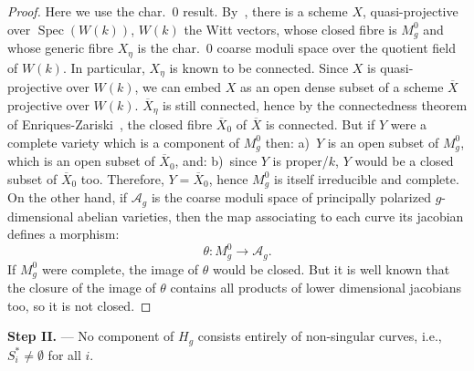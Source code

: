 \documentclass[10pt]{amsart}
\theoremstyle{plain}
\theoremstyle{definition}
\DeclareMathOperator{\Spec}{Spec}
\begin{document}
\begin{proof}
Here we use the char.~$0$ result. By~\cite{M1}, there is a scheme $X$, quasi-projective over $\Spec(W(k))$, $W(k)$ the Witt vectors, whose closed fibre is $M_g^0$ and whose generic fibre $X_\eta$ is the char.~$0$ coarse moduli space over the quotient field of $W(k)$. In particular, $X_\eta$ is known to be connected. Since $X$ is quasi-projective over $W(k)$, we can embed $X$ as an open dense subset of a scheme $\overline{X}$ projective over $W(k)$. $\overline{X}_\eta$ is still connected, hence by the connectedness theorem of Enriques-Zariski~\cite{EGA3}, the closed fibre $\overline{X}_0$ of $\overline{X}$ is connected. But if $Y$ were a complete variety which is a component of $M_g^0$ then: a)~$Y$ is an open subset of $M_g^0$, which is an open subset of $\overline{X}_0$, and: b)~since $Y$ is proper/$k$, $Y$ would be a closed subset of $\overline{X}_0$ too. Therefore, $Y = \overline{X}_0$, hence $M_g^0$ is itself irreducible and complete. On the other hand, if $\mathscr{A}_g$ is the coarse moduli space of principally polarized $g$-dimensional abelian varieties, then the map associating to each curve its jacobian defines a morphism:
\[
\theta: M_g^0 \longrightarrow \mathscr{A}_g.
\]
If $M_g^0$ were complete, the image of $\theta$ would be closed. But it is well known that the closure of the image of $\theta$ contains all products of lower dimensional jacobians too, so it is not closed.
\end{proof}

\textbf{Step II.} --- No component of $H_g$ consists entirely of non-singular curves, i.e., $S_i^* \neq \emptyset$ for all $i$.
\end{document}
